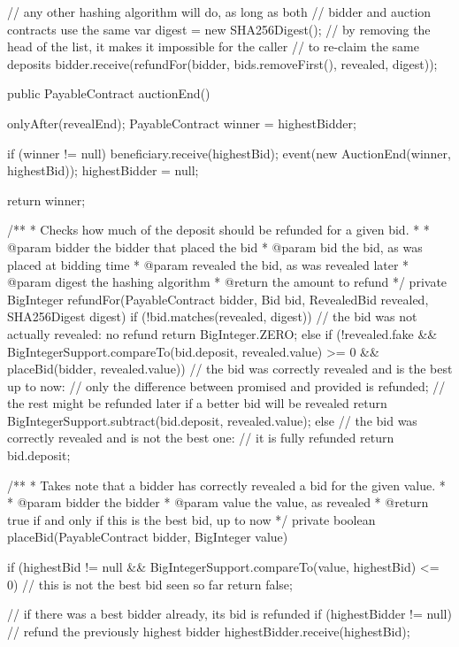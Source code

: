 \begin{codebox}
\begin{javalst}
{{    // any other hashing algorithm will do, as long as both
    // bidder and auction contracts use the same
    var digest = new SHA256Digest();
    // by removing the head of the list, it makes it impossible for the caller
    // to re-claim the same deposits
    bidder.receive(refundFor(bidder, bids.removeFirst(), revealed, digest));
  }

  public PayableContract auctionEnd() {
    onlyAfter(revealEnd);
    PayableContract winner = highestBidder;
		
    if (winner != null) {
      beneficiary.receive(highestBid);
      event(new AuctionEnd(winner, highestBid));
      highestBidder = null;
    }

    return winner;
  }

  /**
  * Checks how much of the deposit should be refunded for a given bid.
  * 
  * @param bidder the bidder that placed the bid
  * @param bid the bid, as was placed at bidding time
  * @param revealed the bid, as was revealed later
  * @param digest the hashing algorithm
  * @return the amount to refund
  */
  private BigInteger refundFor(PayableContract bidder, Bid bid, RevealedBid revealed,
                               SHA256Digest digest) {
    if (!bid.matches(revealed, digest))
      // the bid was not actually revealed: no refund
      return BigInteger.ZERO;
    else if (!revealed.fake && BigIntegerSupport.compareTo(bid.deposit, revealed.value) >= 0
             && placeBid(bidder, revealed.value))
      // the bid was correctly revealed and is the best up to now:
      // only the difference between promised and provided is refunded;
      // the rest might be refunded later if a better bid will be revealed
      return BigIntegerSupport.subtract(bid.deposit, revealed.value);
    else
      // the bid was correctly revealed and is not the best one:
      // it is fully refunded
      return bid.deposit;
  }

  /**
  * Takes note that a bidder has correctly revealed a bid for the given value.
  * 
  * @param bidder the bidder
  * @param value the value, as revealed
  * @return true if and only if this is the best bid, up to now
  */
  private boolean placeBid(PayableContract bidder, BigInteger value) {
    if (highestBid != null && BigIntegerSupport.compareTo(value, highestBid) <= 0)
      // this is not the best bid seen so far
      return false;

    // if there was a best bidder already, its bid is refunded
    if (highestBidder != null)
      // refund the previously highest bidder
      highestBidder.receive(highestBid);

}}
\end{javalst}
\end{codebox}
